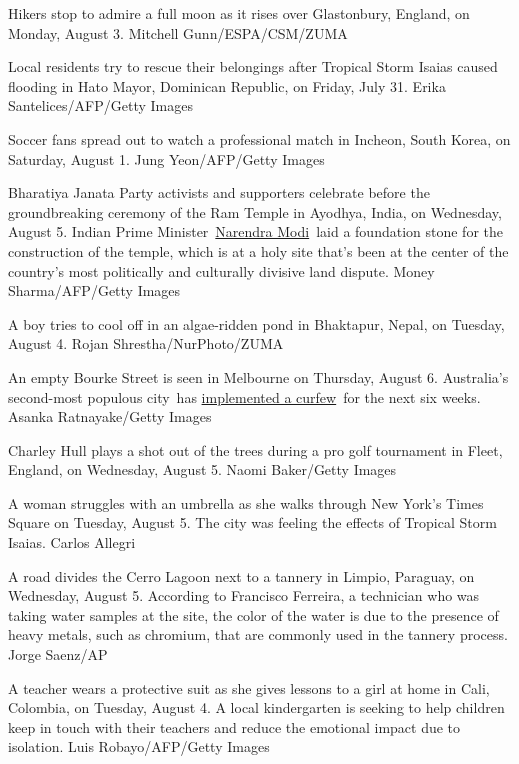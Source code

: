 Hikers stop to admire a full moon as it rises over Glastonbury, England,
on Monday, August 3. Mitchell Gunn/ESPA/CSM/ZUMA

Local residents try to rescue their belongings after Tropical Storm
Isaias caused flooding in Hato Mayor, Dominican Republic, on Friday,
July 31. Erika Santelices/AFP/Getty Images

Soccer fans spread out to watch a professional match in Incheon, South
Korea, on Saturday, August 1. Jung Yeon/AFP/Getty Images

Bharatiya Janata Party activists and supporters celebrate before the
groundbreaking ceremony of the Ram Temple in Ayodhya, India, on
Wednesday, August 5. Indian Prime
Minister~\href{https://www.cnn.com/2020/08/04/asia/ayodhya-temple-modi-foundation-stone-intl-hnk/index.html}{Narendra
Modi}~laid a foundation stone for the construction of the temple, which
is at a holy site that's been at the center of the country's most
politically and culturally divisive land dispute. Money Sharma/AFP/Getty
Images

A boy tries to cool off in an algae-ridden pond in Bhaktapur, Nepal, on
Tuesday, August 4. Rojan Shrestha/NurPhoto/ZUMA

An empty Bourke Street is seen in Melbourne on Thursday, August 6.
Australia's second-most populous city~has
\href{https://www.cnn.com/2020/08/03/australia/australia-melbourne-coronavirus-intl-hnk/index.html}{implemented
a curfew}~for the next six weeks. Asanka Ratnayake/Getty Images

Charley Hull plays a shot out of the trees during a pro golf tournament
in Fleet, England, on Wednesday, August 5. Naomi Baker/Getty Images

A woman struggles with an umbrella as she walks through New York's Times
Square on Tuesday, August 5. The city was feeling the effects of
Tropical Storm Isaias. Carlos Allegri

A road divides the Cerro Lagoon next to a tannery in Limpio, Paraguay,
on Wednesday, August 5. According to Francisco Ferreira, a technician
who was taking water samples at the site, the color of the water is due
to the presence of heavy metals, such as chromium, that are commonly
used in the tannery process. Jorge Saenz/AP

A teacher wears a protective suit as she gives lessons to a girl at home
in Cali, Colombia, on Tuesday, August 4. A local kindergarten is seeking
to help children keep in touch with their teachers and reduce the
emotional impact due to isolation. Luis Robayo/AFP/Getty Images

